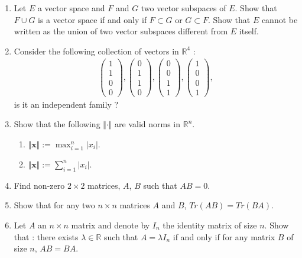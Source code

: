 \documentclass[11pt,letterpaper]{scrartcl}
\newcommand{\reals}{\mathbb{R}}
\begin{document}
\begin{enumerate}
	\item Let $E$ a vector space and $F$ and $G$ two vector subspaces of $E$. Show that $F \cup G$ is a vector space if and only if $F \subset G$ or $G \subset F$. Show that $E$ cannot be written as the union of two vector subspaces different from $E$ itself.

	\item Consider the following collection of vectors in $\reals^4$ :
	\begin{align*}
	\begin{pmatrix}
	1 \\ 1 \\ 0 \\ 0
	\end{pmatrix},
	\begin{pmatrix}
	0 \\ 1 \\ 1 \\ 0
	\end{pmatrix},
	\begin{pmatrix}
	0 \\ 0 \\ 1 \\ 1
	\end{pmatrix},
	\begin{pmatrix}
	1 \\ 0 \\ 0 \\ 1
	\end{pmatrix},
	\end{align*}
	is it an independent family ?
	

	\item Show that the following $\Vert\cdot\Vert$ are valid norms in $\mathbb{R}^{n}$.
		\begin{enumerate}
		\item $\Vert\mathbf{x}\Vert:=\max_{i=1}^{n}\vert x_{i}\vert$.
		\item $\Vert\mathbf{x}\Vert:=\sum_{i=1}^{n}\vert x_{i}\vert$.
		\end{enumerate}

	\item Find non-zero $2\times2$ matrices, $A$, $B$ such that $AB=0$.

	\item Show that for any two $n \times n$ matrices $A$ and $B$, $Tr(AB)=Tr(BA)$.

	\item Let $A$ an $n \times n$ matrix and denote by $I_n$ the identity matrix of size $n$. Show that : there exists $\lambda \in \reals$ such that $A = \lambda I_n$ if and only if for any matrix $B$ of size $n$, $AB=BA$.
	


\end{enumerate}
\end{document}
